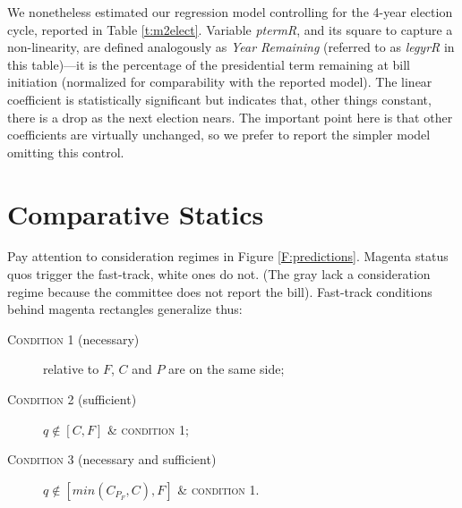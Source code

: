\documentclass[letter,12pt]{article}
\begin{document}
We nonetheless estimated our regression model controlling for the 4-year election cycle, reported in Table \ref{t:m2elect}. Variable \emph{ptermR}, and its square to capture a non-linearity, are defined analogously as \emph{Year Remaining} (referred to as \emph{legyrR} in this table)---it is the percentage of the presidential term remaining at bill initiation (normalized for comparability with the reported model). The linear coefficient is statistically significant but indicates that, other things constant, there is a drop as the next election nears. The important point here is that other coefficients are virtually unchanged, so we prefer to report the simpler model omitting this control. 

\section{Comparative Statics}

Pay attention to consideration regimes in Figure \ref{F:predictions}. Magenta status quos trigger the fast-track, white ones do not. (The gray lack a consideration regime because the committee does not report the bill). Fast-track conditions behind magenta rectangles generalize thus:  

\begin{description}
\item[\textsc{Condition 1} (necessary)] relative to $F$, $C$ and $P$ are on the same side; 
\item[\textsc{Condition 2} (sufficient)]  $q \notin [C,F]$ \& \textsc{condition 1};
\item[\textsc{Condition 3} (necessary and sufficient)] $q \notin [min(C_{P_F},C),F]$ \& \textsc{condition 1}.
\end{description}


\end{document}
